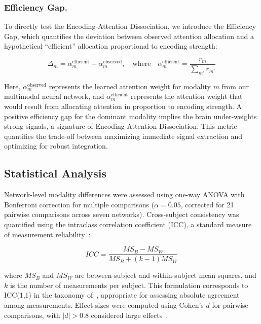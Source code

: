 \documentclass[10pt,letterpaper]{article}
\begin{document}
\subsubsection{Efficiency Gap.}

To directly test the Encoding-Attention Dissociation, we introduce the Efficiency Gap, which quantifies the deviation between observed attention allocation and a hypothetical ``efficient'' allocation proportional to encoding strength:

\begin{equation}\label{eq:delta}
\Delta_m = \alpha_m^{\text{efficient}} - \alpha_m^{\text{observed}}, \quad \text{where} \quad \alpha_m^{\text{efficient}} = \frac{r_m}{\sum_{m'} r_{m'}}
\end{equation}

Here, $\alpha_m^{\text{observed}}$ represents the learned attention weight for modality $m$ from our multimodal neural network, and $\alpha_m^{\text{efficient}}$ represents the attention weight that would result from allocating attention in proportion to encoding strength. A positive efficiency gap for the dominant modality implies the brain under-weights strong signals, a signature of Encoding-Attention Dissociation. This metric quantifies the trade-off between maximizing immediate signal extraction and optimizing for robust integration.

\subsection{Statistical Analysis}

Network-level modality differences were assessed using one-way ANOVA with Bonferroni correction for multiple comparisons ($\alpha = 0.05$, corrected for 21 pairwise comparisons across seven networks). Cross-subject consistency was quantified using the intraclass correlation coefficient (ICC), a standard measure of measurement reliability~\citep{shrout1979intraclass}:

\begin{equation}\label{eq:icc}
ICC = \frac{MS_B - MS_W}{MS_B + (k-1)MS_W}
\end{equation}

where $MS_B$ and $MS_W$ are between-subject and within-subject mean squares, and $k$ is the number of measurements per subject. This formulation corresponds to ICC(1,1) in the taxonomy of~\citet{shrout1979intraclass}, appropriate for assessing absolute agreement among measurements. Effect sizes were computed using Cohen's $d$ for pairwise comparisons, with $|d| > 0.8$ considered large effects~\citep{cohen2013statistical}.
\end{document}

